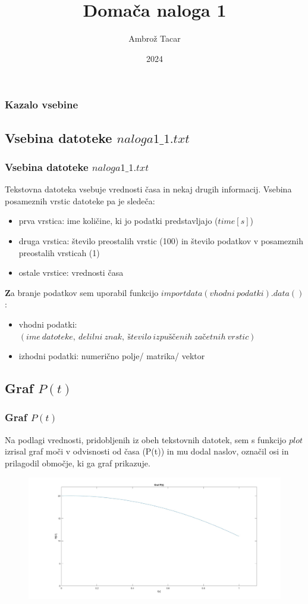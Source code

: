 \documentclass{beamer}
\title{Domača naloga 1}
\author{Ambrož Tacar}
\institute{Fakulteta za strojništvo,UL}
\date{2024}
\begin{document}
\frame{\titlepage}
\begin{frame}
\frametitle{Kazalo vsebine}
\tableofcontents
\end{frame}
\begin{frame} 
\section{Vsebina datoteke $naloga1\_1.txt$}
\frametitle{Vsebina datoteke $naloga1\_1.txt$}
Tekstovna datoteka vsebuje vrednosti časa in nekaj drugih informacij. Vsebina posameznih vrstic datoteke pa je sledeča:
\begin{itemize}
    \item prva vrstica: ime količine, ki jo podatki predstavljajo ($time[s]$)
    \item druga vrstica: število preostalih vrstic (100) in število podatkov v posameznih preostalih vrsticah (1)
    \item ostale vrstice: vrednosti časa
\end{itemize}
\vspace{5pt}
\textbf Za branje podatkov sem uporabil funkcijo $importdata(vhodni\ podatki).data()$ :
\begin{itemize}
    \item vhodni podatki: $(ime\ datoteke,\ delilni\ znak,\ število\ izpuščenih\ začetnih\ vrstic)$ 
    \item izhodni podatki: numerično polje/ matrika/ vektor 
\end{itemize}
\end{frame}
\begin{frame} 
\section{Graf $P(t)$}
\frametitle{Graf $P(t)$}
Na podlagi vrednosti, pridobljenih iz obeh tekstovnih datotek, sem s funkcijo $plot$ izrisal graf moči v odvisnosti od časa (P(t)) in mu dodal naslov, označil osi in prilagodil območje, ki ga graf prikazuje.
\begin{figure}
    \centering
    \includegraphics[width=0.9\linewidth]{Graf P(t).jpg}
    \label{P(t)}
\end{figure}
\end{frame} 
\end{document}
